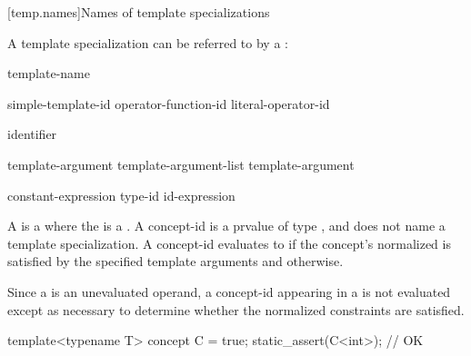 \documentclass{wg21}
\begin{document}
[temp.names]{Names of template specializations}

\pnum
A template specialization  can be referred to by a
:

\begin{bnf}
    \br
    template-name \terminal{<}  \terminal{>}
\end{bnf}

\begin{bnf}
    \br
    simple-template-id\br
    operator-function-id \terminal{<}  \terminal{>}\br
    literal-operator-id \terminal{<}  \terminal{>}
\end{bnf}

\begin{bnf}
    \br
    identifier
\end{bnf}

\begin{bnf}
    \br
    template-argument \br
    template-argument-list \terminal{,} template-argument 
\end{bnf}

\begin{bnf}
    \br
    constant-expression\br
    type-id\br
    id-expression\br
\end{bnf}

\ednote{[...]}

\pnum
A  is a 
where the  is a  .
A concept-id is a prvalue of type , and
does not name a template specialization.
A concept-id evaluates to 
if the concept's
normalized  
is satisfied  by the specified template arguments and
 otherwise.
\begin{note}
    Since a  is an unevaluated operand,
    a concept-id appearing in a 
    is not evaluated except as necessary
    to determine whether the normalized constraints are satisfied.
\end{note}
\begin{example}
    \begin{codeblock}
        template<typename T> concept C = true;
        static_assert(C<int>);      // OK
    \end{codeblock}
\end{example}
\end{document}
